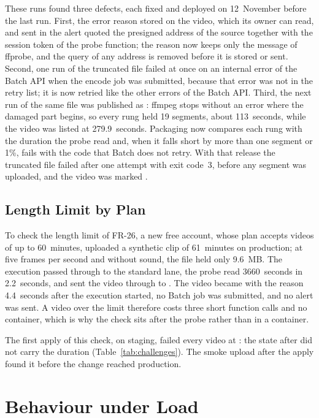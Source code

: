 These runs found three defects, each fixed and deployed on 12~November before the last run.
First, the error reason stored on the video, which its owner can read, and sent in the alert quoted
the presigned address of the source together with the session token of the probe function; the
reason now keeps only the message of ffprobe, and the query of any address is removed before it is
stored or sent. Second, one run of the truncated file failed at once on an internal error of the
Batch API when the encode job was submitted, because that error was not in the retry list; it is
now retried like the other errors of the Batch API. Third, the next run of the same file was
published as : ffmpeg stops without an error where the damaged part begins, so every
rung held 19 segments, about 113~seconds, while the video was listed at 279.9~seconds. Packaging now
compares each rung with the duration the probe read and, when it falls short by more than one
segment or 1\%, fails with the code that Batch does not retry. With that release the truncated file
failed after one attempt with exit code~3, before any segment was uploaded, and the video was
marked .

\subsection{Length Limit by Plan}
\label{sec:length-evaluation}

To check the length limit of FR-26, a new free account, whose plan accepts videos of up to 60~minutes,
uploaded a synthetic clip of 61~minutes on production; at five frames per second and without sound,
the file held only 9.6~MB. The execution passed through  to the standard lane, the
probe read 3660~seconds in 2.2~seconds, and  sent the video through 
to . The video became  with the reason  4.4~seconds
after the execution started, no Batch job was submitted, and no alert was sent. A video over the limit
therefore costs three short function calls and no container, which is why the check sits after the
probe rather than in a container.

The first apply of this check, on staging, failed every video at : the state after
 did not carry the duration (Table~\ref{tab:challenges}). The smoke upload after the apply
found it before the change reached production.

\section{Behaviour under Load}
\label{sec:load-testing}

